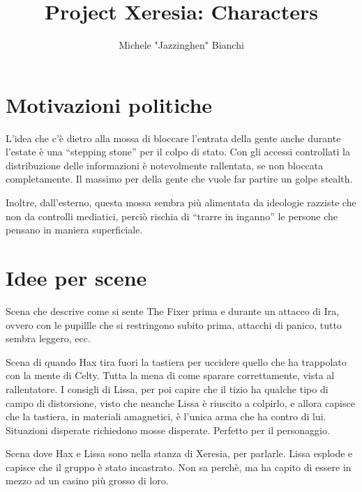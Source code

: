 \documentclass[9pt,a4paper,cleardoubleempty]{scrbook}
\author{Michele "Jazzinghen" Bianchi}
\title{Project Xeresia: Characters}
\begin{document}
   
    \chapter{Motivazioni politiche}

    L'idea che c'è dietro alla mossa di bloccare l'entrata della gente
    anche durante l'estate è una ``stepping stone'' per il colpo di stato.
    Con gli accessi controllati la distribuzione delle informazioni è
    notevolmente rallentata, se non bloccata completamente. Il massimo per
    della gente che vuole far partire un golpe stealth.

    Inoltre, dall'esterno, questa mossa sembra più alimentata da ideologie
    razziste che non da controlli mediatici, perciò  rischia di ``trarre in
    inganno'' le persone che pensano in maniera superficiale.

    \chapter{Idee per scene}

    Scena che descrive come si sente The Fixer prima e durante un attacco di
    Ira, ovvero con le pupillle che si restringono subito prima, attacchi
    di panico, tutto sembra leggero, ecc.

    Scena di quando Hax tira fuori la tastiera per uccidere quello che ha
    trappolato con la mente di Celty. Tutta la mena di come sparare
    correttamente, vista al rallentatore. I consigli di Lissa, per poi
    capire che il tizio ha qualche tipo di campo di distorsione, visto che
    neanche Lissa è riuscito a colpirlo, e allora capisce che la tastiera,
    in materiali amagnetici, è l'unica arma che ha contro di lui.
    Situazioni disperate richiedono mosse disperate. Perfetto per il
    personaggio.

    Scena dove Hax e Lissa sono nella stanza di Xeresia, per parlarle.
    Lissa esplode e capisce che il gruppo è stato incastrato. Non sa
    perchè, ma ha capito di essere in mezzo ad un casino più grosso di
    loro.
\end{document}
